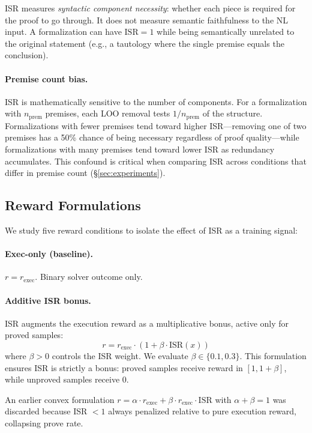 ISR measures \emph{syntactic component necessity}: whether each piece is required for the proof to go through.
It does not measure semantic faithfulness to the NL input.
A formalization can have $\text{ISR} = 1$ while being semantically unrelated to the original statement (e.g., a tautology where the single premise equals the conclusion).

\paragraph{Premise count bias.}
ISR is mathematically sensitive to the number of components.
For a formalization with $n_{\text{prem}}$ premises, each LOO removal tests $1/n_{\text{prem}}$ of the structure.
Formalizations with fewer premises tend toward higher ISR---removing one of two premises has a 50\% chance of being necessary regardless of proof quality---while formalizations with many premises tend toward lower ISR as redundancy accumulates.
This confound is critical when comparing ISR across conditions that differ in premise count (\S\ref{sec:experiments}).

\subsection{Reward Formulations}
\label{sec:reward}

We study five reward conditions to isolate the effect of ISR as a training signal:

\paragraph{Exec-only (baseline).}
$r = r_{\text{exec}}$. Binary solver outcome only.

\paragraph{Additive ISR bonus.}
ISR augments the execution reward as a multiplicative bonus, active only for proved samples:
\begin{equation}
  r = r_{\text{exec}} \cdot (1 + \beta \cdot \text{ISR}(x))
  \label{eq:additive_isr}
\end{equation}
where $\beta > 0$ controls the ISR weight.
We evaluate $\beta \in \{0.1, 0.3\}$.
This formulation ensures ISR is strictly a bonus: proved samples receive reward in $[1, 1{+}\beta]$, while unproved samples receive $0$.

An earlier convex formulation $r = \alpha \cdot r_{\text{exec}} + \beta \cdot r_{\text{exec}} \cdot \text{ISR}$ with $\alpha + \beta = 1$ was discarded because ISR $< 1$ always penalized relative to pure execution reward, collapsing prove rate.

